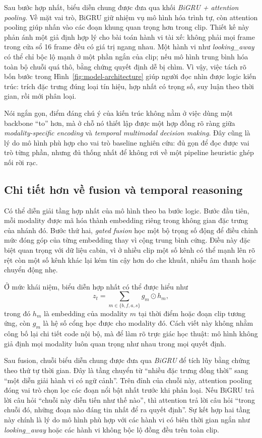 \documentclass[conference,a4paper]{IEEEtran}
\begin{document}
Sau bước hợp nhất, biểu diễn chung được đưa qua khối \textit{BiGRU + attention pooling}. Về mặt vai trò, BiGRU giữ nhiệm vụ mô hình hóa trình tự, còn attention pooling giúp nhấn vào các đoạn khung quan trọng hơn trong clip. Thiết kế này phản ánh một giả định hợp lý cho bài toán hành vi tài xế: không phải mọi frame trong cửa sổ 16 frame đều có giá trị ngang nhau. Một hành vi như \textit{looking\_away} có thể chỉ bộc lộ mạnh ở một phần ngắn của clip; nếu mô hình trung bình hóa toàn bộ chuỗi quá thô, bằng chứng quyết định dễ bị chìm. Vì vậy, việc tách rõ bốn bước trong Hình~\ref{fig:model-architecture} giúp người đọc nhìn được logic kiến trúc: trích đặc trưng đúng loại tín hiệu, hợp nhất có trọng số, suy luận theo thời gian, rồi mới phân loại.

Nói ngắn gọn, điểm đáng chú ý của kiến trúc không nằm ở việc dùng một backbone ``to'' hơn, mà ở chỗ nó thiết lập được một hợp đồng rõ ràng giữa \textit{modality-specific encoding} và \textit{temporal multimodal decision making}. Đây cũng là lý do mô hình phù hợp cho vai trò baseline nghiên cứu: đủ gọn để đọc được vai trò từng phần, nhưng đủ thống nhất để không rơi về một pipeline heuristic ghép nối rời rạc.

\subsection{Chi tiết hơn về fusion và temporal reasoning}
Có thể diễn giải tầng hợp nhất của mô hình theo ba bước logic. Bước đầu tiên, mỗi modality được mã hóa thành embedding riêng trong không gian đặc trưng của nhánh đó. Bước thứ hai, \textit{gated fusion} học một bộ trọng số động để điều chỉnh mức đóng góp của từng embedding thay vì cộng trung bình cứng. Điều này đặc biệt quan trọng với dữ liệu cabin, vì ở nhiều clip một số kênh có thể mạnh lên rõ rệt còn một số kênh khác lại kém tin cậy hơn do che khuất, nhiễu âm thanh hoặc chuyển động nhẹ.

Ở mức khái niệm, biểu diễn hợp nhất có thể được hiểu như
\begin{equation}
z_t = \sum_{m \in \{b,f,a,s\}} g_m \odot h_m ,
\end{equation}
trong đó $h_m$ là embedding của modality $m$ tại thời điểm hoặc đoạn clip tương ứng, còn $g_m$ là hệ số cổng học được cho modality đó. Cách viết này không nhằm công bố lại chi tiết code nội bộ, mà để làm rõ trực giác học thuật: mô hình không giả định mọi modality luôn quan trọng như nhau trong mọi quyết định.

Sau fusion, chuỗi biểu diễn chung được đưa qua \textit{BiGRU} để tích lũy bằng chứng theo thứ tự thời gian. Đây là tầng chuyển từ ``nhiều đặc trưng đồng thời'' sang ``một diễn giải hành vi có ngữ cảnh''. Trên đỉnh của chuỗi này, attention pooling đóng vai trò chọn lọc các đoạn nổi bật nhất trước khi phân loại. Nếu BiGRU trả lời câu hỏi ``chuỗi này diễn tiến như thế nào'', thì attention trả lời câu hỏi ``trong chuỗi đó, những đoạn nào đáng tin nhất để ra quyết định''. Sự kết hợp hai tầng này chính là lý do mô hình phù hợp với các hành vi có biên thời gian ngắn như \textit{looking\_away} hoặc các hành vi không bộc lộ đồng đều trên toàn clip.
\end{document}
